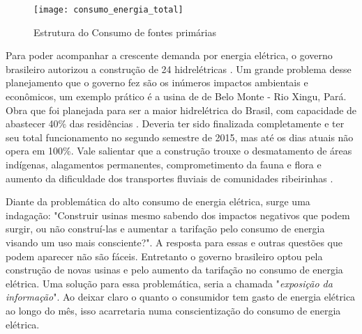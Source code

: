 \begin{figure}[h!]
	\texttt{[image: consumo\_energia\_total]}
	\centering
	\caption[Estrutura do Consumo de fontes primárias]{Estrutura do Consumo de fontes primárias}
	\label{fig:consumo_energia_total}
\end{figure}
\FloatBarrier

Para poder acompanhar a crescente demanda por energia elétrica, o governo brasileiro autorizou a construção de 24 hidrelétricas \cite{governo-preve}.
Um grande problema desse planejamento que o governo fez são os inúmeros impactos ambientais e econômicos, um exemplo prático é a usina de de Belo Monte - Rio Xingu, Pará. Obra que foi planejada
para ser a maior hidrelétrica do Brasil, com capacidade de abastecer 40\% das residências \cite{energia-abastece}.
Deveria ter sido finalizada completamente e ter seu total funcionamento no segundo semestre de 2015, mas até os dias atuais não opera em 100\%. Vale salientar que a construção
trouxe o desmatamento de áreas indígenas, alagamentos permanentes, comprometimento da fauna e flora e aumento da dificuldade dos transportes fluviais
de comunidades ribeirinhas \cite{ref-g1}.

Diante da problemática do alto consumo de energia elétrica, surge uma indagação: "Construir usinas mesmo sabendo dos impactos negativos que podem surgir, ou não construí-las e
aumentar a tarifação pelo consumo de energia visando um uso mais consciente?". A resposta para essas e outras questões que podem aparecer não são fáceis.
Entretanto o governo brasileiro optou pela construção de novas usinas e pelo aumento da tarifação no consumo de energia elétrica. 
Uma solução para essa problemática, seria a chamada "\textit{exposição da informação}". Ao deixar claro 
o quanto o consumidor tem gasto de energia elétrica ao longo do mês, isso acarretaria numa conscientização do consumo de energia elétrica.



